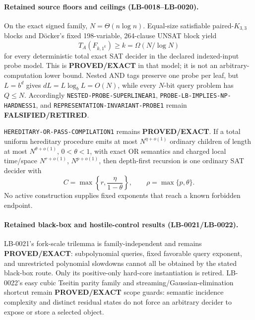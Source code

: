 \documentclass[11pt]{article}
\begin{document}
\paragraph{Retained source floors and ceilings (LB-0018--LB-0020).}
On the exact signed family, \(N=\Theta(n\log n)\).  Equal-size satisfiable
paired-\(K_{3,3}\) blocks and D\"ocker's fixed 198-variable,
264-clause UNSAT block yield
\[
 T_A(F_{k,1^k})\ge k=\Omega(N/\log N)
\]
for every deterministic total exact SAT decider in the declared
indexed-input probe model.  This is \textbf{PROVED/EXACT} in that model;
it is not an arbitrary-computation lower bound.  Nested AND tags preserve
one probe per leaf, but \(L=b^d\) gives
\(dL=L\log_bL=O(N)\), while every \(N\)-bit query problem has \(Q\le N\).
Accordingly \texttt{NESTED-PROBE-SUPERLINEAR1},
\texttt{PROBE-LB-IMPLIES-NP-HARDNESS1}, and
\texttt{REPRESENTATION-INVARIANT-PROBE1} remain
\textbf{FALSIFIED/RETIRED}.

\texttt{HEREDITARY-OR-PASS-COMPILATION1} remains
\textbf{PROVED/EXACT}.  If a total uniform hereditary procedure emits at
most \(N^{\eta+o(1)}\) ordinary children of length at most
\(N^{\theta+o(1)}\), \(0<\theta<1\), with exact OR semantics and charged
local time/space \(N^{r+o(1)}\), \(N^{p+o(1)}\), then depth-first recursion
is one ordinary SAT decider with
\[
 C=\max\left\{r,\frac{\eta}{1-\theta}\right\},
 \qquad \rho=\max\{p,\theta\}.
\]
No active construction supplies fixed exponents that reach a known
forbidden endpoint.

\paragraph{Retained black-box and hostile-control results (LB-0021/LB-0022).}
LB-0021's fork-scale trilemma is family-independent and remains
\textbf{PROVED/EXACT}: subpolynomial queries, fixed favorable query
exponent, and unrestricted polynomial slowdowns cannot all be obtained by
the stated black-box route.  Only its positive-only hard-core
instantiation is retired.  LB-0022's easy cubic Tseitin parity family and
streaming/Gaussian-elimination shortcut remain \textbf{PROVED/EXACT} scope
guards: semantic incidence complexity and distinct residual states do not
force an arbitrary decider to expose or store a selected object.
\end{document}
